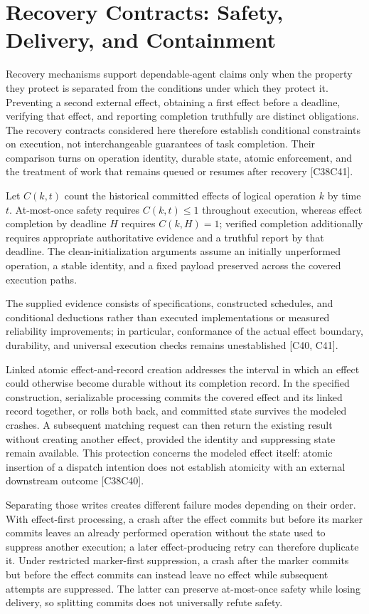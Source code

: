 \documentclass[11pt]{article}
\begin{document}
\section{Recovery Contracts: Safety, Delivery, and Containment}
Recovery mechanisms support dependable-agent claims only when the property they protect is separated from the conditions under which they protect it. Preventing a second external effect, obtaining a first effect before a deadline, verifying that effect, and reporting completion truthfully are distinct obligations. The recovery contracts considered here therefore establish conditional constraints on execution, not interchangeable guarantees of task completion. Their comparison turns on operation identity, durable state, atomic enforcement, and the treatment of work that remains queued or resumes after recovery [C38\textendash{}C41].

Let $C(k,t)$ count the historical committed effects of logical operation $k$ by time $t$. At-most-once safety requires $C(k,t)\leq 1$ throughout execution, whereas effect completion by deadline $H$ requires $C(k,H)=1$; verified completion additionally requires appropriate authoritative evidence and a truthful report by that deadline. The clean-initialization arguments assume an initially unperformed operation, a stable identity, and a fixed payload preserved across the covered execution paths.

The supplied evidence consists of specifications, constructed schedules, and conditional deductions rather than executed implementations or measured reliability improvements; in particular, conformance of the actual effect boundary, durability, and universal execution checks remains unestablished [C40, C41].

Linked atomic effect-and-record creation addresses the interval in which an effect could otherwise become durable without its completion record. In the specified construction, serializable processing commits the covered effect and its linked record together, or rolls both back, and committed state survives the modeled crashes. A subsequent matching request can then return the existing result without creating another effect, provided the identity and suppressing state remain available. This protection concerns the modeled effect itself: atomic insertion of a dispatch intention does not establish atomicity with an external downstream outcome [C38\textendash{}C40].

Separating those writes creates different failure modes depending on their order. With effect-first processing, a crash after the effect commits but before its marker commits leaves an already performed operation without the state used to suppress another execution; a later effect-producing retry can therefore duplicate it. Under restricted marker-first suppression, a crash after the marker commits but before the effect commits can instead leave no effect while subsequent attempts are suppressed. The latter can preserve at-most-once safety while losing delivery, so splitting commits does not universally refute safety.
\end{document}
